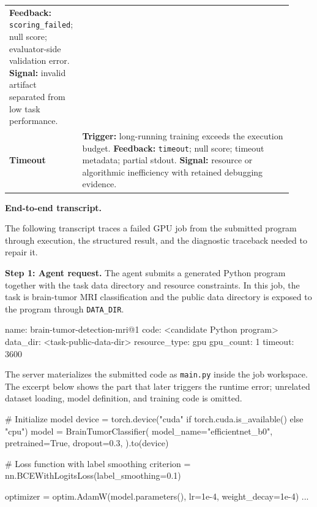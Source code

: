 \begin{table}[h!]
\begin{tabular}{@{}>{\raggedright\arraybackslash}p{0.19\linewidth}>{\raggedright\arraybackslash}p{0.73\linewidth}@{}}
      \textbf{Feedback:} \texttt{scoring\_failed}; null score; evaluator-side validation error.\newline
      \textbf{Signal:} invalid artifact separated from low task performance. \\
    \addlinespace[2pt]
    \textbf{Timeout}
    & \textbf{Trigger:} long-running training exceeds the execution budget.\newline
      \textbf{Feedback:} \texttt{timeout}; null score; timeout metadata; partial stdout.\newline
      \textbf{Signal:} resource or algorithmic inefficiency with retained debugging evidence. \\
    \bottomrule
  \end{tabular}
\end{table}

\textbf{End-to-end transcript.}

The following transcript traces a failed GPU job from the submitted program through execution, the structured result, and the diagnostic traceback needed to repair it.

\noindent\textbf{Step 1: Agent request.}
The agent submits a generated Python program together with the task data directory and resource constraints.
In this job, the task is brain-tumor MRI classification and the public data directory is exposed to the program through \texttt{DATA\_DIR}.

\begin{SandboxTranscript}
name: brain-tumor-detection-mri@1
code: <candidate Python program>
data_dir: <task-public-data-dir>
resource_type: gpu
gpu_count: 1
timeout: 3600
\end{SandboxTranscript}

The server materializes the submitted code as \texttt{main.py} inside the job workspace.
The excerpt below shows the part that later triggers the runtime error; unrelated dataset loading, model definition, and training code is omitted.

\begin{SandboxTranscript}
# Initialize model
device = torch.device("cuda" if torch.cuda.is_available() else "cpu")
model = BrainTumorClassifier(
    model_name="efficientnet_b0",
    pretrained=True,
    dropout=0.3,
).to(device)

# Loss function with label smoothing
criterion = nn.BCEWithLogitsLoss(label_smoothing=0.1)

optimizer = optim.AdamW(model.parameters(), lr=1e-4, weight_decay=1e-4)
...
\end{SandboxTranscript}

